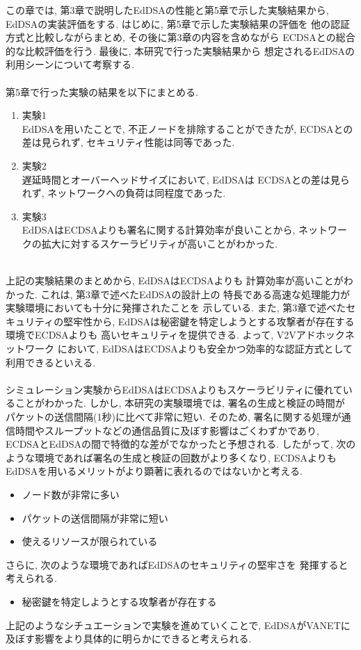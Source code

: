 この章では, 第3章で説明したEdDSAの性能と第5章で示した実験結果から, 
EdDSAの実装評価をする. はじめに, 第5章で示した実験結果の評価を
他の認証方式と比較しながらまとめ, その後に第3章の内容を含めながら
ECDSAとの総合的な比較評価を行う. 最後に, 本研究で行った実験結果から
想定されるEdDSAの利用シーンについて考察する.\\[1em]
 \\
\indent 第5章で行った実験の結果を以下にまとめる. 
\begin{enumerate}
  \item 実験1\\
  \indent EdDSAを用いたことで, 不正ノードを排除することができたが, 
  ECDSAとの差は見られず, セキュリティ性能は同等であった. 
  \item 実験2\\
  \indent 遅延時間とオーバーヘッドサイズにおいて, EdDSAは
  ECDSAとの差は見られず, ネットワークへの負荷は同程度であった.
  \item 実験3\\
  \indent EdDSAはECDSAよりも署名に関する計算効率が良いことから, 
  ネットワークの拡大に対するスケーラビリティが高いことがわかった.
\end{enumerate}

\\
\indent 上記の実験結果のまとめから, EdDSAはECDSAよりも
計算効率が高いことがわかった. これは, 第3章で述べたEdDSAの設計上の
特長である高速な処理能力が実験環境においても十分に発揮されたことを
示している. また, 第3章で述べたセキュリティの堅牢性から, 
EdDSAは秘密鍵を特定しようとする攻撃者が存在する環境でECDSAよりも
高いセキュリティを提供できる. よって, V2Vアドホックネットワーク
において, EdDSAはECDSAよりも安全かつ効率的な認証方式として
利用できるといえる.\\

\\
\indent シミュレーション実験からEdDSAはECDSAよりもスケーラビリティに優れていることがわかった. 
しかし, 本研究の実験環境では, 署名の生成と検証の時間が
パケットの送信間隔(1秒)に比べて非常に短い. そのため,
署名に関する処理が通信時間やスループットなどの通信品質に及ぼす影響はごくわずかであり,  
ECDSAとEdDSAの間で特徴的な差がでなかったと予想される. 
したがって, 次のような環境であれば署名の生成と検証の回数がより多くなり, 
ECDSAよりもEdDSAを用いるメリットがより顕著に表れるのではないかと考える. 
\begin{itemize}
  \item ノード数が非常に多い
  \item パケットの送信間隔が非常に短い
  \item 使えるリソースが限られている
\end{itemize}
さらに, 次のような環境であればEdDSAのセキュリティの堅牢さを
発揮すると考えられる. 
\begin{itemize}
  \item 秘密鍵を特定しようとする攻撃者が存在する
\end{itemize} 

\indent 上記のようなシチュエーションで実験を進めていくことで,
EdDSAがVANETに及ぼす影響をより具体的に明らかにできると考えられる. 






